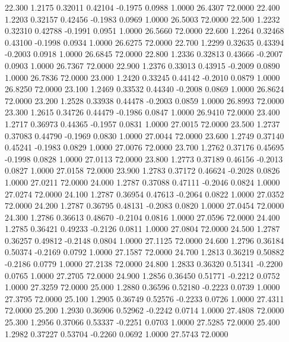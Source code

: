  22.300   1.2175   0.32011   0.42104  -0.1975   0.0988   1.0000  26.4307  72.0000
  22.400   1.2203   0.32157   0.42456  -0.1983   0.0969   1.0000  26.5003  72.0000
  22.500   1.2232   0.32310   0.42788  -0.1991   0.0951   1.0000  26.5660  72.0000
  22.600   1.2264   0.32468   0.43100  -0.1998   0.0934   1.0000  26.6275  72.0000
  22.700   1.2299   0.32635   0.43394  -0.2003   0.0918   1.0000  26.6845  72.0000
  22.800   1.2336   0.32813   0.43666  -0.2007   0.0903   1.0000  26.7367  72.0000
  22.900   1.2376   0.33013   0.43915  -0.2009   0.0890   1.0000  26.7836  72.0000
  23.000   1.2420   0.33245   0.44142  -0.2010   0.0879   1.0000  26.8250  72.0000
  23.100   1.2469   0.33532   0.44340  -0.2008   0.0869   1.0000  26.8624  72.0000
  23.200   1.2528   0.33938   0.44478  -0.2003   0.0859   1.0000  26.8993  72.0000
  23.300   1.2615   0.34726   0.44479  -0.1986   0.0847   1.0000  26.9410  72.0000
  23.400   1.2717   0.36973   0.44365  -0.1957   0.0831   1.0000  27.0015  72.0000
  23.500   1.2737   0.37083   0.44790  -0.1969   0.0830   1.0000  27.0044  72.0000
  23.600   1.2749   0.37140   0.45241  -0.1983   0.0829   1.0000  27.0076  72.0000
  23.700   1.2762   0.37176   0.45695  -0.1998   0.0828   1.0000  27.0113  72.0000
  23.800   1.2773   0.37189   0.46156  -0.2013   0.0827   1.0000  27.0158  72.0000
  23.900   1.2783   0.37172   0.46624  -0.2028   0.0826   1.0000  27.0211  72.0000
  24.000   1.2787   0.37088   0.47111  -0.2046   0.0824   1.0000  27.0274  72.0000
  24.100   1.2787   0.36954   0.47613  -0.2064   0.0822   1.0000  27.0352  72.0000
  24.200   1.2787   0.36795   0.48131  -0.2083   0.0820   1.0000  27.0454  72.0000
  24.300   1.2786   0.36613   0.48670  -0.2104   0.0816   1.0000  27.0596  72.0000
  24.400   1.2785   0.36421   0.49233  -0.2126   0.0811   1.0000  27.0804  72.0000
  24.500   1.2787   0.36257   0.49812  -0.2148   0.0804   1.0000  27.1125  72.0000
  24.600   1.2796   0.36184   0.50374  -0.2169   0.0792   1.0000  27.1587  72.0000
  24.700   1.2813   0.36219   0.50882  -0.2186   0.0779   1.0000  27.2138  72.0000
  24.800   1.2833   0.36320   0.51341  -0.2200   0.0765   1.0000  27.2705  72.0000
  24.900   1.2856   0.36450   0.51771  -0.2212   0.0752   1.0000  27.3259  72.0000
  25.000   1.2880   0.36596   0.52180  -0.2223   0.0739   1.0000  27.3795  72.0000
  25.100   1.2905   0.36749   0.52576  -0.2233   0.0726   1.0000  27.4311  72.0000
  25.200   1.2930   0.36906   0.52962  -0.2242   0.0714   1.0000  27.4808  72.0000
  25.300   1.2956   0.37066   0.53337  -0.2251   0.0703   1.0000  27.5285  72.0000
  25.400   1.2982   0.37227   0.53704  -0.2260   0.0692   1.0000  27.5743  72.0000
